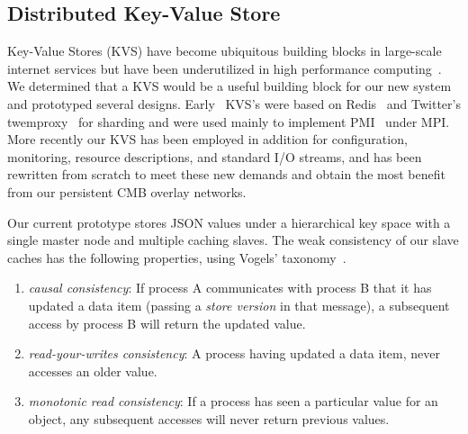 \subsection{Distributed Key-Value Store}

Key-Value Stores (KVS) have become ubiquitous building blocks in large-scale
internet services but have been underutilized in high performance
computing~\cite{Wang:2013:USE:2503210.2503239}.
We determined that a KVS would be a
useful building block for our new system and prototyped several designs.
Early \flux\ KVS's were based on Redis~\cite{Redis} and Twitter's
twemproxy~\cite{Twemproxy} for sharding and were used mainly to implement
PMI~\cite{PMI2} under MPI.  More recently our KVS has been employed 
in addition for configuration, monitoring, resource descriptions, and
standard I/O streams, and has been rewritten from scratch to meet these
new demands and obtain the most benefit from our persistent CMB overlay
networks.

Our current prototype stores JSON values under a hierarchical key space
with a single master node and multiple caching slaves.  The weak consistency
of our slave caches has the following properties, using Vogels'
taxonomy~\cite{Vogels:2009:EC:1435417.1435432}.

\begin{enumerate}
\item{{\em causal consistency}:  If process A communicates with process B
that it has updated a data item (passing a {\em store version} in that
message), a subsequent access by process B will return the updated value.}
\item{{\em read-your-writes consistency}:  A process having updated a
data item, never accesses an older value.}
\item{{\em monotonic read consistency}:  If a process has seen a particular
value for an object, any subsequent accesses will never return previous values.}
\end{enumerate}

